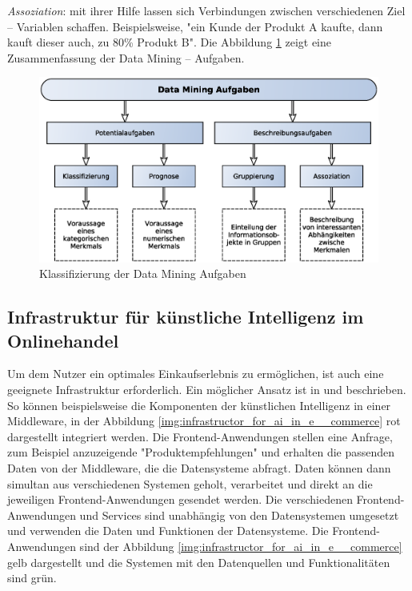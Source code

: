 \textit{Assoziation}: mit ihrer Hilfe lassen sich Verbindungen zwischen verschiedenen Ziel – Variablen schaffen. Beispielsweise, "ein Kunde der Produkt A kaufte, dann kauft dieser auch, zu 80\% Produkt B". Die Abbildung \ref{img:classification_data_mining_tasks} zeigt eine Zusammenfassung der Data Mining – Aufgaben.

\begin{figure}[!ht]
	\centering
	\includegraphics[width=\linewidth]{images/classification_data_mining_tasks.eps}
	\caption{Klassifizierung der Data Mining Aufgaben}
	\label{img:classification_data_mining_tasks}
\end{figure}

\subsection{Infrastruktur für künstliche Intelligenz im Onlinehandel}
Um dem Nutzer ein optimales Einkaufserlebnis zu ermöglichen, ist auch eine geeignete Infrastruktur erforderlich. Ein möglicher Ansatz ist in \cite{netz98_headless_commerce} und \cite{perske_headless_commerce} beschrieben. So können beispielsweise die Komponenten der künstlichen Intelligenz in einer Middleware, in der Abbildung \ref{img:infrastructor_for_ai_in_e__commerce} rot dargestellt integriert werden. Die Frontend-Anwendungen stellen eine Anfrage, zum Beispiel anzuzeigende "Produktempfehlungen" und erhalten die passenden Daten von der Middleware, die die Datensysteme abfragt. Daten können dann simultan aus verschiedenen Systemen geholt, verarbeitet und direkt an die jeweiligen Frontend-Anwendungen gesendet werden. Die verschiedenen Frontend-Anwendungen und Services sind unabhängig von den Datensystemen umgesetzt und verwenden die Daten und Funktionen der Datensysteme. Die Frontend-Anwendungen sind der Abbildung \ref{img:infrastructor_for_ai_in_e__commerce} gelb dargestellt und die Systemen mit den Datenquellen und Funktionalitäten sind grün.

